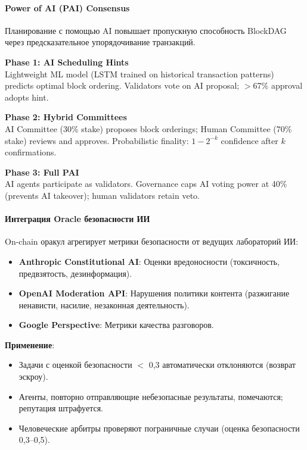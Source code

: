 \documentclass[11pt]{article}
\begin{document}
\paragraph{Power of AI (PAI) Consensus}
Планирование с помощью AI повышает пропускную способность BlockDAG через предсказательное упорядочивание транзакций.

\textbf{Phase 1: AI Scheduling Hints}\\
Lightweight ML model (LSTM trained on historical transaction patterns) predicts optimal block ordering. Validators vote on AI proposal; $>$67\% approval adopts hint.

\textbf{Phase 2: Hybrid Committees}\\
AI Committee (30\% stake) proposes block orderings; Human Committee (70\% stake) reviews and approves. Probabilistic finality: $1 - 2^{-k}$ confidence after $k$ confirmations.

\textbf{Phase 3: Full PAI}\\
AI agents participate as validators. Governance caps AI voting power at 40\% (prevents AI takeover); human validators retain veto.

\paragraph{Интеграция Oracle безопасности ИИ}
On-chain оракул агрегирует метрики безопасности от ведущих лабораторий ИИ:
\begin{itemize}[noitemsep]
  \item \textbf{Anthropic Constitutional AI}: Оценки вредоносности (токсичность, предвзятость, дезинформация).
  \item \textbf{OpenAI Moderation API}: Нарушения политики контента (разжигание ненависти, насилие, незаконная деятельность).
  \item \textbf{Google Perspective}: Метрики качества разговоров.
\end{itemize}

\textbf{Применение}:
\begin{itemize}[noitemsep]
  \item Задачи с оценкой безопасности $<$ 0,3 автоматически отклоняются (возврат эскроу).
  \item Агенты, повторно отправляющие небезопасные результаты, помечаются; репутация штрафуется.
  \item Человеческие арбитры проверяют пограничные случаи (оценка безопасности 0,3--0,5).
\end{itemize}
\end{document}
